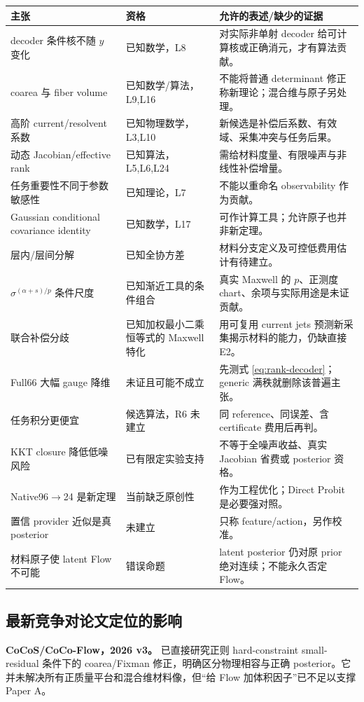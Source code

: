 \begin{longtable}{p{.29\linewidth}p{.24\linewidth}p{.39\linewidth}}
\toprule
主张 & 资格 & 允许的表述/缺少的证据\\
\midrule
decoder 条件核不随 $y$ 变化 & 已知数学，L8 & 对实际非单射 decoder 给可计算核或正确消元，才有算法贡献。\\
coarea 与 fiber volume & 已知数学/算法，L9,L16 & 不能将普通 determinant 修正称新理论；混合维与原子另处理。\\
高阶 current/resolvent 系数 & 已知物理数学，L3,L10 & 新候选是补偿后系数、有效域、采集冲突与任务后果。\\
动态 Jacobian/effective rank & 已知算法，L5,L6,L24 & 需给材料度量、有限噪声与非线性补偿增量。\\
任务重要性不同于参数敏感性 & 已知理论，L7 & 不能以重命名 observability 作为贡献。\\
Gaussian conditional covariance identity & 已知数学，L17 & 可作计算工具；允许原子也并非新定理。\\
层内/层间分解 & 已知全协方差 & 材料分支定义及可控低费用估计有待建立。\\
$\sigma^{(\alpha+s)/p}$ 条件尺度 & 已知渐近工具的条件组合 & 真实 Maxwell 的 $p$、正测度 chart、余项与实际用途是未证贡献。\\
联合补偿分歧 & 已知加权最小二乘恒等式的 Maxwell 特化 & 用可复用 current jets 预测新采集揭示材料的能力，仍缺直接 E2。\\
Full66 大幅 gauge 降维 & 未证且可能不成立 & 先测式 \eqref{eq:rank-decoder}；generic 满秩就删除该普遍主张。\\
任务积分更便宜 & 候选算法，R6 未建立 & 同 reference、同误差、含 certificate 费用后再判。\\
KKT closure 降低低噪风险 & 已有限定实验支持 & 不等于全噪声收益、真实 Jacobian 省费或 posterior 资格。\\
Native96$\to$24 是新定理 & 当前缺乏原创性 & 作为工程优化；Direct Probit 是必要强对照。\\
置信 provider 近似是真 posterior & 未建立 & 只称 feature/action，另作校准。\\
材料原子使 latent Flow 不可能 & 错误命题 & latent posterior 仍对原 prior 绝对连续；不能永久否定 Flow。\\
\bottomrule
\end{longtable}

\subsection{最新竞争对论文定位的影响}
\textbf{CoCoS/CoCo-Flow，2026 v3。} 已直接研究正则 hard-constraint small-residual 条件下的 coarea/Fixman 修正，明确区分物理相容与正确 posterior。它并未解决所有正质量平台和混合维材料像，但“给 Flow 加体积因子”已不足以支撑 Paper A。

